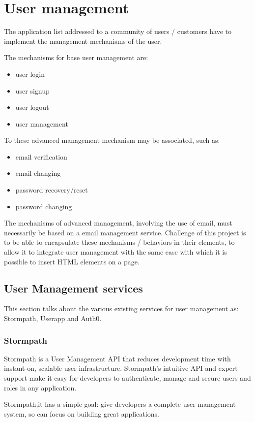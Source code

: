 \section{User management}
\label{sec:USR_user_management}

The application list addressed to a community of users / customers have to implement the management mechanisms of the user.

The mechanisms for base user management are:
\begin{itemize}
\item user login 
\item user signup
\item user logout
\item user management
\end{itemize}
To these advanced management mechanism may be associated, such as:
\begin{itemize}
\item email verification 
\item email changing  
\item password recovery/reset 
\item password changing  
\end{itemize}

The mechanisms of advanced management, involving the use of email, must necessarily be based on a email management service.
Challenge of this project is to be able to encapsulate these mechanisms / behaviors in their elements, to allow it to integrate user management with the same ease with which it is possible to insert HTML elements on a page.

\subsection{User Management services}
\label{subsec:USR_user_management_services}
This section talks about the various existing services for user management as: Stormpath, Userapp and Auth0.
\subsubsection{Stormpath}

Stormpath is a User Management API that reduces development time with instant-on, scalable user infrastructure. Stormpath's intuitive API and expert support make it easy for developers to authenticate, manage and secure users and roles in any application.

Stormpath,it has a simple goal: give developers a complete user management system, so can focus on building great applications.\cite{usr_stormpath}

